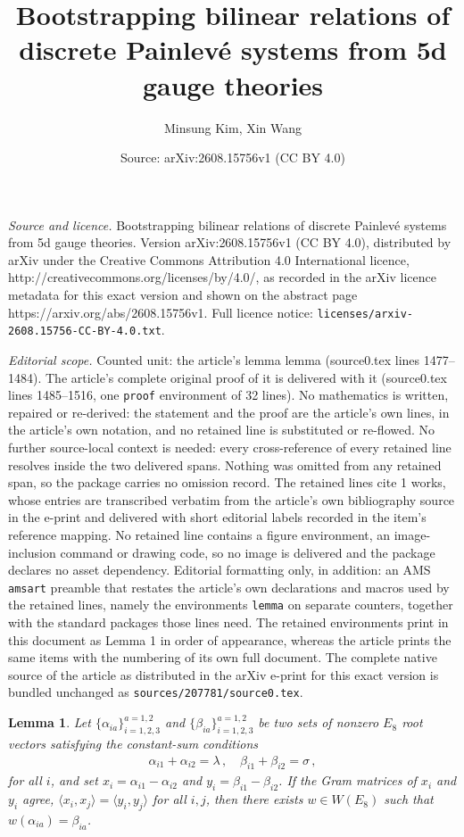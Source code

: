 \documentclass[10pt,a4paper]{amsart}
\title{Bootstrapping bilinear relations of discrete Painlev\'e systems from 5d gauge theories}
\author{Minsung Kim, Xin Wang}
\date{Source: arXiv:2608.15756v1 (CC BY 4.0)}
\newtheorem{lemma}{Lemma}
\begin{document}
\maketitle

\noindent\emph{Source and licence.} Bootstrapping bilinear relations of discrete Painlev\'e systems from 5d gauge theories. Version arXiv:2608.15756v1 (CC BY 4.0), distributed by arXiv under the Creative Commons Attribution 4.0 International licence, http://creativecommons.org/licenses/by/4.0/, as recorded in the arXiv licence metadata for this exact version and shown on the abstract page https://arxiv.org/abs/2608.15756v1. Full licence notice: \texttt{licenses/arxiv-2608.15756-CC-BY-4.0.txt}.\par\smallskip

\noindent\textit{Editorial scope.} Counted unit: the article's lemma lemma (source0.tex lines 1477--1484). The article's complete original proof of it is delivered with it (source0.tex lines 1485--1516, one \texttt{proof} environment of 32 lines). No mathematics is written, repaired or re-derived: the statement and the proof are the article's own lines, in the article's own notation, and no retained line is substituted or re-flowed.  No further source-local context is needed: every cross-reference of every retained line resolves inside the two delivered spans.  Nothing was omitted from any retained span, so the package carries no omission record.  The retained lines cite 1 works, whose entries are transcribed verbatim from the article's own bibliography source in the e-print and delivered with short editorial labels recorded in the item's reference mapping.  No retained line contains a figure environment, an image-inclusion command or drawing code, so no image is delivered and the package declares no asset dependency.  Editorial formatting only, in addition: an AMS \texttt{amsart} preamble that restates the article's own declarations and macros used by the retained lines, namely the environments \texttt{lemma} on separate counters, together with the standard packages those lines need.  The retained environments print in this document as Lemma 1 in order of appearance, whereas the article prints the same items with the numbering of its own full document.  The complete native source of the article as distributed in the arXiv e-print for this exact version is bundled unchanged as \texttt{sources/207781/source0.tex}.
\begin{lemma}
    Let $ \{\alpha_{ia}\}_{i=1,2,3}^{a=1,2} $ and $ \{\beta_{ia}\}_{i=1,2,3}^{a=1,2} $ be two sets of nonzero $ E_8 $ root vectors satisfying the constant-sum conditions
    \begin{align}
        \alpha_{i1}+\alpha_{i2}=\lambda \, , \quad
        \beta_{i1}+\beta_{i2}=\sigma \, ,
    \end{align}
    for all $ i $, and set $ x_i = \alpha_{i1}-\alpha_{i2} $ and $ y_i=\beta_{i1}-\beta_{i2} $. If the Gram matrices of $ x_i $ and $ y_i $ agree, $ \langle x_i, x_j \rangle = \langle y_i, y_j \rangle $ for all $ i,j $, then there exists $ w \in W(E_8) $ such that $ w(\alpha_{ia}) = \beta_{ia} $.
\end{lemma}
\end{document}
